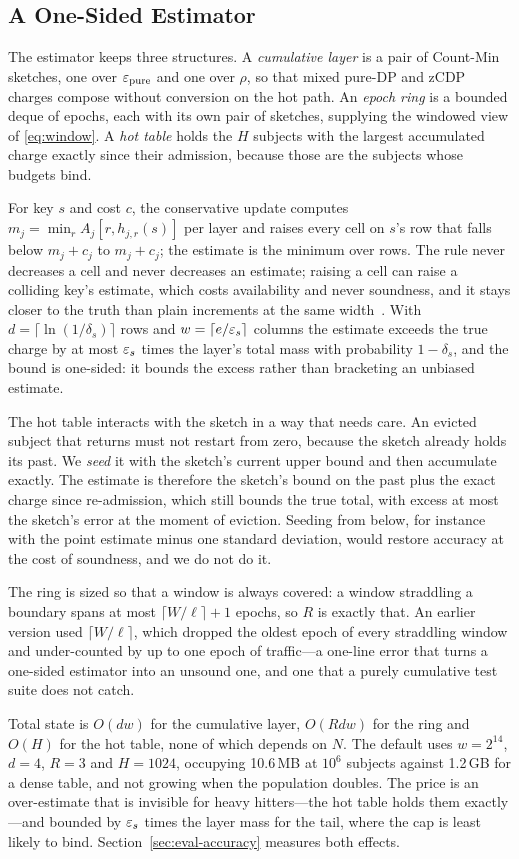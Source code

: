 \subsection{A One-Sided Estimator}
\label{sec:design-accountant}

The estimator keeps three structures. A \emph{cumulative layer} is a pair of
Count-Min sketches, one over $\varepsilon_{\mathrm{pure}}$ and one over $\rho$, so that
mixed pure-DP and zCDP charges compose without conversion on the hot path. An
\emph{epoch ring} is a bounded deque of epochs, each with its own pair of
sketches, supplying the windowed view of \eqref{eq:window}. A \emph{hot table}
holds the $H$ subjects with the largest accumulated charge exactly since their
admission, because those are the subjects whose budgets bind.

For key $s$ and cost $c$, the conservative update computes
$m_j=\min_{r} A_j[r,h_{j,r}(s)]$ per layer and raises every cell on $s$'s row
that falls below $m_j+c_j$ to $m_j+c_j$; the estimate is the minimum over rows.
The rule never decreases a cell and never decreases an estimate; raising a cell can
raise a colliding key's estimate, which costs availability and never soundness, and it
stays closer to the truth than plain increments at the same
width~\cite{fusy2022phase,fusy2023countmin}. With $d=\lceil\ln(1/\delta_s)\rceil$ rows
and $w=\lceil e/\varepsilon_s\rceil$ columns the estimate exceeds the true charge by at most
$\varepsilon_s$ times the layer's total mass with probability $1-\delta_s$, and the bound is
one-sided: it bounds the excess rather than bracketing an unbiased estimate.

The hot table interacts with the sketch in a way that needs care. An evicted
subject that returns must not restart from zero, because the sketch already holds
its past. We \emph{seed} it with the sketch's current upper bound and then
accumulate exactly. The estimate is therefore the sketch's bound on the past plus
the exact charge since re-admission, which still bounds the true total, with
excess at most the sketch's error at the moment of eviction. Seeding from below,
for instance with the point estimate minus one standard deviation, would restore
accuracy at the cost of soundness, and we do not do it.

The ring is sized so that a window is always covered: a window straddling a boundary
spans at most $\lceil W/\ell\rceil+1$ epochs, so $R$ is exactly that. An earlier
version used $\lceil W/\ell\rceil$, which dropped the oldest epoch of every straddling
window and under-counted by up to one epoch of traffic---a one-line error that turns a
one-sided estimator into an unsound one, and one that a purely cumulative test suite
does not catch.

Total state is $O(dw)$ for the cumulative layer, $O(Rdw)$ for the ring and $O(H)$
for the hot table, none of which depends on $N$. The default uses $w=2^{14}$, $d=4$,
$R=3$ and $H=1024$, occupying 10.6\,MB at $10^6$ subjects against 1.2\,GB for a dense
 table, and not growing when the
population doubles. The price is an over-estimate that is invisible for heavy
hitters---the hot table holds them exactly---and bounded by $\varepsilon_s$ times the layer
mass for the tail, where the cap is least likely to bind.
Section~\ref{sec:eval-accuracy} measures both effects.
